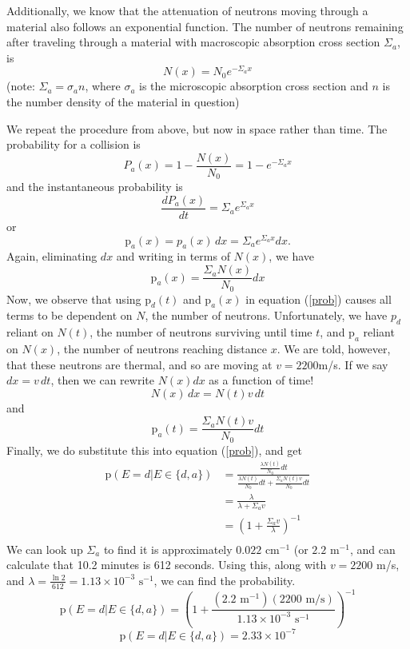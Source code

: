 Additionally, we know that the attenuation of neutrons moving through a material also follows an exponential function. The number of neutrons remaining after traveling through a material with macroscopic absorption cross section $\Sigma_a$, is
$$ N(x) = N_0 e^{-\Sigma_a x} $$
(note: $\Sigma_a = \sigma_a n$, where $\sigma_a$ is the microscopic absorption cross section and $n$ is the number density of the material in question) 

We repeat the procedure from above, but now in space rather than time. The probability for a collision is
$$ P_a(x) = 1-\frac{N(x)}{N_0} = 1 - e^{-\Sigma_a x} $$
and the instantaneous probability is 
$$ \frac{dP_a(x)}{dt} = \Sigma_a e^{\Sigma_a x} $$
or 
$$ \text{p}_a(x) = p_a(x) \, dx = \Sigma_a e^{\Sigma_a x} dx .$$
Again, eliminating $dx$ and writing in terms of $N(x)$, we have
$$ \text{p}_a(x) = \frac{\Sigma_a N(x)}{N_0} dx $$
Now, we observe that using $\text{p}_d(t)$ and $\text{p}_a(x)$ in equation (\ref{prob}) causes all terms to be dependent on $N$, the number of neutrons. Unfortunately, we have $p_d$ reliant on $N(t)$, the number of neutrons surviving until time $t$, and $\text{p}_a$ reliant on $N(x)$, the number of neutrons reaching distance $x$. We are told, however, that these neutrons are thermal, and so are moving at $v = 2200$m/s. If we say $dx = v \, dt$, then we can rewrite $N(x) dx$ as a function of time! 
$$ N(x) \, dx = N(t) v \, dt $$
and
$$ \text{p}_a(t) = \frac{\Sigma_a N(t) v}{N_0} dt $$
Finally, we do substitute this into equation (\ref{prob}), and get
\begin{align*}
\text{p}(E=d | E \in \{d,a\})	&= \frac{\frac{\lambda N(t)}{N_0} dt}{\frac{\lambda N(t)}{N_0} dt + \frac{\Sigma_a N(t) v}{N_0} dt}\\
								&= \frac{\lambda}{\lambda + \Sigma_a v}\\
								&= \left(1 + \frac{\Sigma_a v}{\lambda}\right)^{-1}\\
\end{align*}
We can look up $\Sigma_a$ to find it is approximately $0.022\text{ cm}^{-1}$ (or $2.2\text{ m}^{-1}$, and can calculate that 10.2 minutes is 612 seconds.  Using this, along with $v = 2200$ m/s, and $\lambda = \frac{\ln 2}{612} = 1.13\times10^{-3}\text{ s}^{-1}$, we can find the probability.
$$ \text{p}(E=d | E \in \{d,a\}) = \left(1 + \frac{(2.2\text{ m}^{-1})(2200\text{ m/s})}{1.13\times10^{-3}\text{ s}^{-1}}\right)^{-1} $$
$$\boxed{ \text{p}(E=d | E \in \{d,a\}) = 2.33\times10^{-7} }$$

